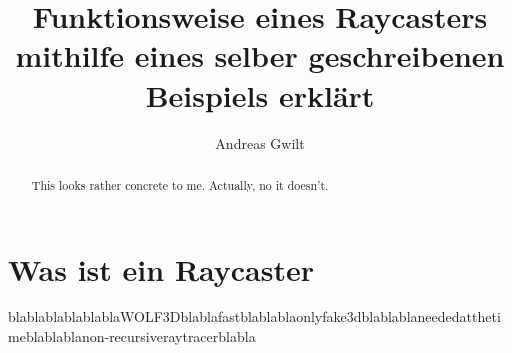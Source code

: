 \documentclass[a4paper,11pt]{report}
\title{Funktionsweise eines Raycasters mithilfe eines selber geschreibenen Beispiels erkl\"art}
\author{Andreas Gwilt}
\begin{document}
\maketitle
\tableofcontents

\begin{abstract}
This looks rather concrete to me. Actually, no it doesn't.
\end{abstract}

\section{Was ist ein Raycaster}
blablablablablablaWOLF3Dblablafastblablablaonlyfake3dblablablaneededatthetimeblablablanon-recursiveraytracerblabla
\end{document}

